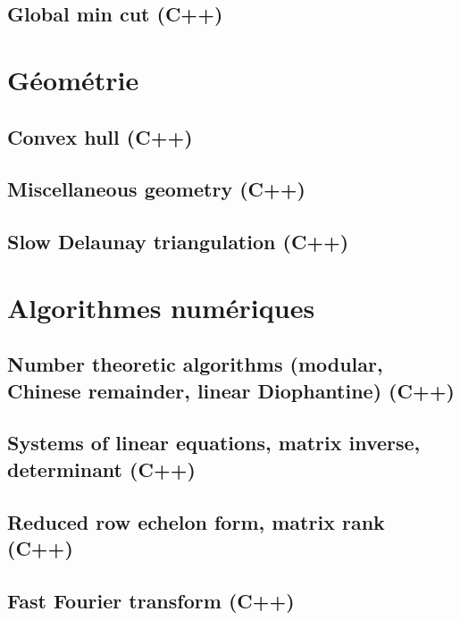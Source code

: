 \documentclass[12pt]{book}
\begin{document}
\section{Global min cut (C++)}
{\tiny}

\chapter{Géométrie}

\section{Convex hull (C++)}
{\tiny}

\section{Miscellaneous geometry (C++)}
{\tiny}

\section{Slow Delaunay triangulation (C++)}
{\tiny}

\chapter{Algorithmes numériques}

\section{Number theoretic algorithms (modular, Chinese remainder, linear Diophantine) (C++)}
{\tiny}

\section{Systems of linear equations, matrix inverse, determinant (C++)}
{\tiny}

\section{Reduced row echelon form, matrix rank (C++)}
{\tiny}

\section{Fast Fourier transform (C++)}
{\tiny}
\end{document}
